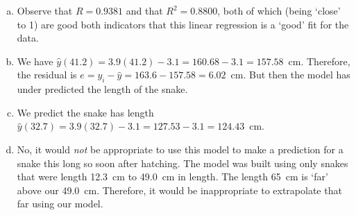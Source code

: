 \documentclass[11pt,letterpaper]{article}
\begin{document}
\sol 
\begin{enumerate}[(a)]
\item Observe that $R= 0.9381$ and that $R^2= 0.8800$, both of which (being `close' to 1) are good both indicators that this linear regression is a `good' fit for the data. 

\item We have $\widehat{y}(41.2)= 3.9(41.2) - 3.1= 160.68 - 3.1= 157.58$~cm. Therefore, the residual is $e= y_i - \widehat{y}= 163.6 - 157.58= 6.02$~cm. But then the model has under predicted the length of the snake. 

\item We predict the snake has length $\widehat{y}(32.7)= 3.9(32.7) - 3.1= 127.53 - 3.1= 124.43$~cm. 

\item No, it would \textit{not} be appropriate to use this model to make a prediction for a snake this long so soon after hatching. The model was built using only snakes that were length 12.3~cm to 49.0~cm in length. The length 65~cm is `far' above our 49.0~cm. Therefore, it would be inappropriate to extrapolate that far using our model. 
\end{enumerate}
\end{document}
